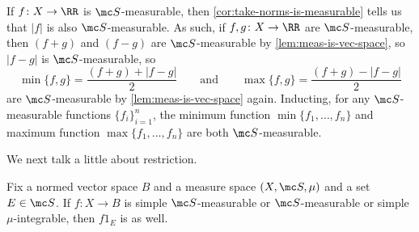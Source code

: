 \documentclass[../notes.tex]{subfiles}
\begin{document}
\begin{example} \label{ex:min-max-meas}
	If $f\colon X\to\RR$ is $\mc S$-measurable, then \autoref{cor:take-norms-is-measurable} tells us that $|f|$ is also $\mc S$-measurable. As such, if $f,g\colon X\to\RR$ are $\mc S$-measurable, then $(f+g)$ and $(f-g)$ are $\mc S$-measurable by \autoref{lem:meas-is-vec-space}, so $|f-g|$ is $\mc S$-measurable, so
	\[\min\{f,g\}=\frac{(f+g)+|f-g|}2\qquad\text{and}\qquad\max\{f,g\}=\frac{(f+g)-|f-g|}2\]
	are $\mc S$-measurable by \autoref{lem:meas-is-vec-space} again. Inducting, for any $\mc S$-measurable functions $\{f_i\}_{i=1}^n$, the minimum function $\min\{f_1,\ldots,f_n\}$ and maximum function $\max\{f_1,\ldots,f_n\}$ are both $\mc S$-measurable.
\end{example}
We next talk a little about restriction.
\begin{lemma} \label{lem:restrict-meas-functions}
	Fix a normed vector space $B$ and a measure space $(X,\mc S,\mu)$ and a set $E\in\mc S$. If $f\colon X\to B$ is simple $\mc S$-measurable or $\mc S$-measurable or simple $\mu$-integrable, then $f1_E$ is as well.
\end{lemma}
\end{document}
